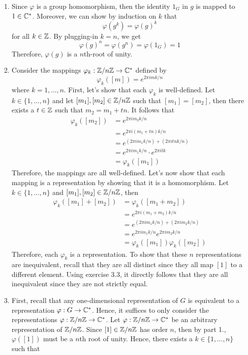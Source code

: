 \begin{solution}
    \begin{enumerate}
        \item Since $\varphi$ is a group homomorphism, then the identity $1_G$ in $g$ is mapped to $1 \in \mathbb{C}^*$. Moreover, we can show by induction on $k$ that
        $$\varphi(g^k) = \varphi(g)^k$$
        for all $k \in \mathbb{Z}$. By plugging-in $k=n$, we get
        $$\varphi(g)^n = \varphi(g^n) = \varphi(1_G) = 1$$
        Therefore, $\varphi(g)$ is a $n$th-root of unity.
        \item Consider the mappings $\varphi_k : \mathbb{Z}/n\mathbb{Z} \to \mathbb{C}^*$ defined by
        $$\varphi_k([m]) = e^{2\pi i m k/n}$$
        where $k=1,...,n$. First, let's show that each $\varphi_k$ is well-defined. Let $k \in \{1, ..., n\}$ and let $[m_1], [m_2] \in \mathbb{Z}/n\mathbb{Z}$ such that $[m_1] = [m_2]$, then there exists a $t \in \mathbb{Z}$ such that $m_2 = m_1 + tn$. It follows that
        \begin{align*}
            \varphi_k([m_2]) &= e^{2\pi i m_2 k/n} \\
            &= e^{2\pi i (m_1 + tn) k/n} \\
            &= e^{(2\pi i m_1 k/n) + (2\pi i tn k/n)} \\
            &= e^{2\pi i m_1 k/n} \cdot e^{2\pi i t k} \\
            &= \varphi_k([m_1])
        \end{align*}
        Therefore, the mappings are all well-defined. Let's now show that each mapping is a representation by showing that it is a homomorphism. Let $k \in \{1, ..., n\}$ and $[m_1], [m_2] \in \mathbb{Z}/n\mathbb{Z}$, then
        \begin{align*}
            \varphi_k([m_1] + [m_2]) &= \varphi_k([m_1 + m_2]) \\
            &= e^{2\pi i (m_1 + m_2) k/n} \\
            &= e^{(2\pi i m_1  k/n) + (2\pi i m_2 k/n)} \\
            &= e^{2\pi i m_1  k/n} e^{2\pi i m_2 k/n} \\
            &= \varphi_k([m_1]) \varphi_k([m_2])
        \end{align*}
        Therefore, each $\varphi_k$ is a representation. To show that these $n$ representations are inequivalent, recall that they are all distinct since they all map $[1]$ to a different element. Using exercise 3.3, it directly follows that they are all inequivalent since they are not strictly equal.
        \item First, recall that any one-dimensional representation of $G$ is equivalent to a representation $\varphi : G \to \mathbb{C}^*$. Hence, it suffices to only consider the representations $\varphi : \mathbb{Z}/n\mathbb{Z} \to \mathbb{C}^*$. Let $\varphi : \mathbb{Z}/n\mathbb{Z} \to \mathbb{C}^*$ be an arbitrary representation of $\mathbb{Z}/n\mathbb{Z}$. Since $[1] \in \mathbb{Z}/n\mathbb{Z}$ has order $n$, then by part 1., $\varphi([1])$ must be a $n$th root of unity. Hence, there exists a $k \in \{1, ..., n\}$ such that

\end{enumerate}
\end{solution}
